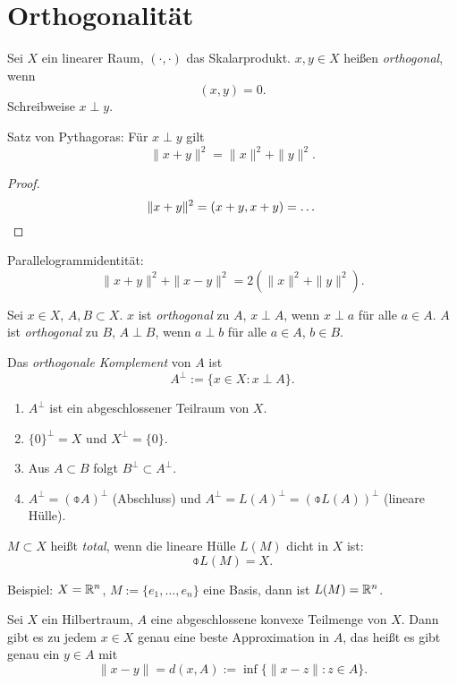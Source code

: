 \setcounter{chapter}{14}
\chapter{Orthogonalität}
Sei $X$ ein linearer Raum, $(\cdot, \cdot)$ das Skalarprodukt. $x,y \in X$
heißen \emph{orthogonal}, wenn
\[ (x,y) = 0. \]
Schreibweise $x \perp y$.

Satz von Pythagoras: Für $x \perp y$ gilt
\[ \| x + y \|^2 = \| x \|^2 + \| y \|^2. \]

\begin{proof}
  \[ \|x+y\|^2 = (x+y,x+y) = \ldots \qedhere \]
\end{proof}

Parallelogrammidentität:
\[ \|x+y\|^2 + \|x-y\|^2 = 2(\|x\|^2 + \|y\|^2). \]

Sei $x \in X$, $A,B \subset X$. $x$ ist \emph{orthogonal} zu $A$, $x \perp A$,
wenn $x \perp a$ für alle $a \in A$. $A$ ist \emph{orthogonal} zu $B$, $A \perp
B$, wenn $a \perp b$ für alle $a \in A$, $b \in B$.

Das \emph{orthogonale Komplement} von $A$ ist
\[ A^\perp := \{ x \in X : x \perp A \}. \]

\renewcommand{\thethm}{O.\arabic{thm}}
\setcounter{thm}{0}
\begin{aufg} %
  \begin{enumerate}
  \item $A^\perp$ ist ein abgeschlossener Teilraum von $X$.
  \item $\{ 0 \}^\perp = X$ und $X^\perp = \{ 0 \}$.
  \item Aus $A \subset B$ folgt $B^\perp \subset A^\perp$.
  \item $A^\perp = (\obar{A})^\perp$ (Abschluss) und $A^\perp = L(A)^\perp =
    (\obar{L(A)})^\perp$ (lineare Hülle).
  \end{enumerate}
\end{aufg}

$M \subset X$ heißt \emph{total}, wenn die lineare Hülle $L(M)$ dicht in $X$
ist:
\[ \obar{L(M)} = X. \]

Beispiel: $X = \mathbb{R}^n$, $M := \{e_1, \ldots, e_n\}$ eine Basis, dann ist
$L(M) = \mathbb{R}^n$.

\clearpage

\begin{thm}[Approximationssatz] %
  Sei $X$ ein Hilbertraum, $A$ eine abgeschlossene konvexe Teilmenge von $X$.
  Dann gibt es zu jedem $x \in X$ genau eine beste Approximation in $A$, das
  heißt es gibt genau ein $y \in A$ mit
  \[ \| x - y \| = d(x,A) := \inf \{ \| x - z \| : z \in A \}. \]
\end{thm}

